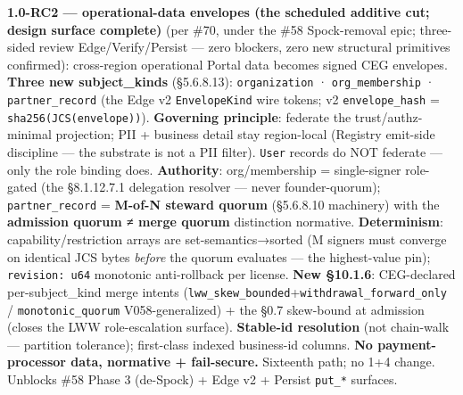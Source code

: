\documentclass[10pt]{article}
\begin{document}
\textbf{1.0-RC2 — operational-data envelopes (the scheduled additive cut; design surface complete)} (per \#70, under the \#58 Spock-removal epic; three-sided review Edge/Verify/Persist — zero blockers, zero new structural primitives confirmed): cross-region operational Portal data becomes signed CEG envelopes. \textbf{Three new subject\_kinds} (§5.6.8.13): \texttt{organization} · \texttt{org\_membership} · \texttt{partner\_record} (the Edge v2 \texttt{EnvelopeKind} wire tokens; v2 \texttt{envelope\_hash} = \texttt{sha256(JCS(envelope))}). \textbf{Governing principle}: federate the trust/authz-minimal projection; PII + business detail stay region-local (Registry emit-side discipline — the substrate is not a PII filter). \texttt{User} records do NOT federate — only the role binding does. \textbf{Authority}: org/membership = single-signer role-gated (the §8.1.12.7.1 delegation resolver — never founder-quorum); \texttt{partner\_record} = \textbf{M-of-N steward quorum} (§5.6.8.10 machinery) with the \textbf{admission quorum ≠ merge quorum} distinction normative. \textbf{Determinism}: capability/restriction arrays are set-semantics→sorted (M signers must converge on identical JCS bytes \textit{before} the quorum evaluates — the highest-value pin); \texttt{revision: u64} monotonic anti-rollback per license. \textbf{New §10.1.6}: CEG-declared per-subject\_kind merge intents (\texttt{lww\_skew\_bounded}+\texttt{withdrawal\_forward\_only} / \texttt{monotonic\_quorum} V058-generalized) + the §0.7 skew-bound at admission (closes the LWW role-escalation surface). \textbf{Stable-id resolution} (not chain-walk — partition tolerance); first-class indexed business-id columns. \textbf{No payment-processor data, normative + fail-secure.} Sixteenth path; no 1+4 change. Unblocks \#58 Phase 3 (de-Spock) + Edge v2 + Persist \texttt{put\_*} surfaces.
\end{document}
